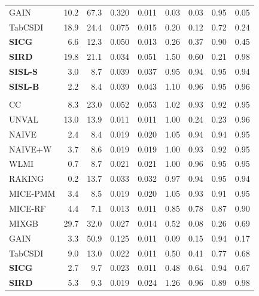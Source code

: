 \begin{longtable}{lrrrrrrrr}
GAIN & 10.2 & 67.3 & 0.320 & 0.011 & 0.03 & 0.03 & \cellcolor{ranktwo}0.95 & 0.05 \\
TabCSDI & 18.9 & 24.4 & 0.075 & 0.015 & 0.20 & 0.12 & 0.72 & 0.24 \\
\textbf{SICG} & 6.6 & 12.3 & 0.050 & 0.013 & 0.26 & 0.37 & 0.90 & 0.45 \\
\textbf{SIRD} & 19.8 & 21.1 & 0.034 & 0.051 & 1.50 & 0.60 & 0.21 & 0.98 \\
\textbf{SISL-S} & 3.0 & 8.7 & 0.039 & 0.037 & \cellcolor{rankthree}0.95 & 0.94 & 0.95 & 0.94 \\
\textbf{SISL-B} & \cellcolor{rankthree}2.2 & \cellcolor{ranktwo}8.4 & 0.039 & 0.043 & 1.10 & \cellcolor{rankthree}0.96 & \cellcolor{rankone}0.95 & 0.96 \\
\addlinespace[3pt]
\multicolumn{9}{l}{\textbf{Continuous Phase-One Covariates}} \\
\addlinespace[2pt]
CC & 8.3 & 23.0 & 0.052 & 0.053 & 1.02 & 0.93 & 0.92 & \cellcolor{ranktwo}0.95 \\
UNVAL & 13.0 & 13.9 & 0.011 & 0.011 & \cellcolor{rankone}1.00 & 0.24 & 0.23 & 0.96 \\
NAIVE & 2.4 & 8.4 & 0.019 & 0.020 & 1.05 & \cellcolor{ranktwo}0.94 & \cellcolor{rankthree}0.94 & \cellcolor{rankone}0.95 \\
NAIVE+W & 3.7 & 8.6 & 0.019 & 0.019 & \cellcolor{ranktwo}1.00 & 0.93 & 0.92 & \cellcolor{rankthree}0.95 \\
WLMI & \cellcolor{rankthree}0.7 & 8.7 & 0.021 & 0.021 & \cellcolor{rankthree}1.00 & \cellcolor{rankthree}0.96 & \cellcolor{rankone}0.95 & 0.95 \\
RAKING & \cellcolor{rankone}0.2 & 13.7 & 0.033 & 0.032 & 0.97 & 0.94 & \cellcolor{ranktwo}0.95 & 0.94 \\
MICE-PMM & 3.4 & 8.5 & 0.019 & 0.020 & 1.05 & 0.93 & 0.91 & 0.95 \\
MICE-RF & 4.4 & \cellcolor{rankone}7.1 & 0.013 & 0.011 & 0.85 & 0.78 & 0.87 & 0.90 \\
MIXGB & 29.7 & 32.0 & 0.027 & 0.014 & 0.52 & 0.08 & 0.26 & 0.69 \\
GAIN & 3.3 & 50.9 & 0.125 & 0.011 & 0.09 & 0.15 & 0.94 & 0.17 \\
TabCSDI & 9.0 & 13.0 & 0.022 & 0.011 & 0.50 & 0.41 & 0.77 & 0.68 \\
\textbf{SICG} & 2.7 & 9.7 & 0.023 & 0.011 & 0.48 & 0.64 & 0.94 & 0.67 \\
\textbf{SIRD} & 5.3 & 9.3 & 0.019 & 0.024 & 1.26 & 0.96 & 0.89 & 0.98 \\

\end{longtable}
